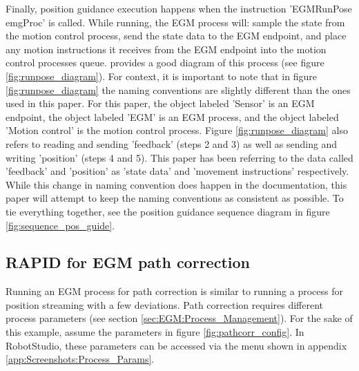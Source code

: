\documentclass{cslthse-msc}
\begin{document}
Finally, position guidance execution happens when the instruction 'EGMRunPose emgProc' is called. While running, the EGM process will: sample the state from the motion control process, send the state data to the EGM endpoint, and place any motion instructions it receives from the EGM endpoint into the motion control processes queue. \cite[Sec. 9.3.2.3]{ABB:controller_software} provides a good diagram of this process (see figure \ref{fig:runpose_diagram}). For context, it is important to note that in figure \ref{fig:runpose_diagram} the naming conventions are slightly different than the ones used in this paper. For this paper, the object labeled 'Sensor' is an EGM endpoint, the object labeled 'EGM' is an EGM process, and the object labeled 'Motion control' is the motion control process. Figure \ref{fig:runpose_diagram} also refers to reading and sending 'feedback' (steps 2 and 3) as well as sending and writing 'position' (steps 4 and 5). This paper has been referring to the data called 'feedback' and 'position' as 'state data' and 'movement instructions' respectively. While this change in naming convention does happen in the documentation, this paper will attempt to keep the naming conventions as consistent as possible. To tie everything together, see the position guidance sequence diagram in figure \ref{fig:sequence_pos_guide}. \par






\subsection{RAPID for EGM path correction}
\label{sec:EGM:Rapid_Programs:corr}
Running an EGM process for path correction is similar to running a process for position streaming with a few deviations. Path correction requires different process parameters (see section \ref{sec:EGM:Process_Management}). For the sake of this example, assume the parameters in figure \ref{fig:pathcorr_config}. In RobotStudio, these parameters can be accessed via the menu shown in appendix \ref{app:Screenshots:Process_Params}. 
\end{document}

